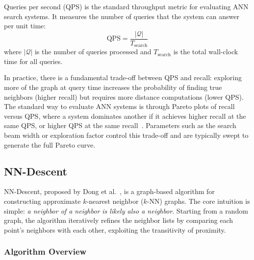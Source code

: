 Queries per second (QPS) is the standard throughput metric for evaluating ANN search systems.
It measures the number of queries that the system can answer per unit time:
\begin{equation}
    \text{QPS} = \frac{|\mathcal{Q}|}{T_{\text{search}}}
\end{equation}
where $|\mathcal{Q}|$ is the number of queries processed and $T_{\text{search}}$ is the total wall-clock time for all queries.

In practice, there is a fundamental trade-off between QPS and recall: exploring more of the graph at query time increases the probability of finding true neighbors (higher recall) but requires more distance computations (lower QPS).
The standard way to evaluate ANN systems is through Pareto plots of recall versus QPS, where a system dominates another if it achieves higher recall at the same QPS, or higher QPS at the same recall~\cite{annbenchmarks}.
Parameters such as the search beam width or exploration factor control this trade-off and are typically swept to generate the full Pareto curve.

\subsection{NN-Descent}
\label{sec:nndescent}

NN-Descent, proposed by Dong et al.~\cite{dong2011}, is a graph-based algorithm for constructing approximate $k$-nearest neighbor ($k$-NN) graphs.
The core intuition is simple: \emph{a neighbor of a neighbor is likely also a neighbor}.
Starting from a random graph, the algorithm iteratively refines the neighbor lists by comparing each point's neighbors with each other, exploiting the transitivity of proximity.

\subsubsection{Algorithm Overview}

